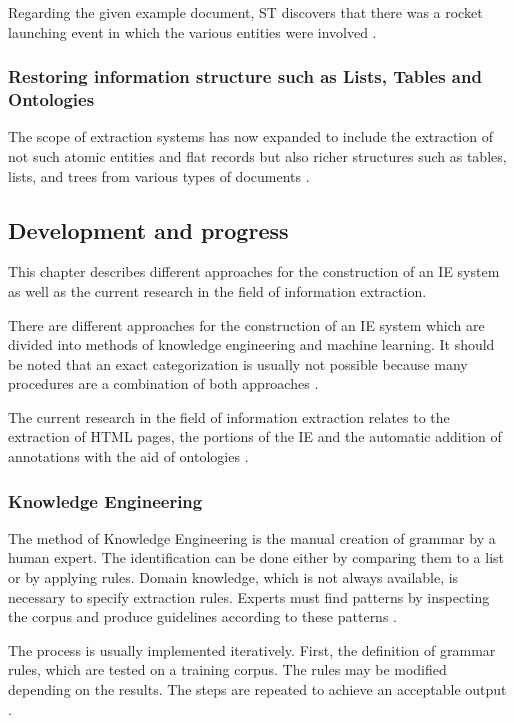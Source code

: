Regarding the given example document, \gls{ST} discovers that there was a rocket launching event in which the various entities were involved \cite{Cunningham:2005}.

\subsubsection{Restoring information structure such as Lists, Tables and Ontologies}
The scope of extraction systems has now expanded to include the extraction of not such atomic entities and flat records but also richer structures such as tables, lists, and trees from various types of documents \cite{Sarawagi:2008}.

\newpage
\subsection{Development and progress}
This chapter describes different approaches for the construction of an IE system as well as the current research in the field of information extraction.

There are different approaches for the construction of an IE system which are divided into methods of knowledge engineering and machine learning. It should be noted that an exact categorization is usually not possible because many procedures are a combination of both approaches \cite{Schramm:2008}.

The current research in the field of information extraction relates to the extraction of HTML pages, the portions of the IE and the automatic addition of annotations with the aid of ontologies \cite{Linsmayr:2010}.

\subsubsection{Knowledge Engineering}
The method of Knowledge Engineering is the manual creation of grammar by a human expert. The identification can be done either by comparing them to a list or by applying rules. Domain knowledge, which is not always available, is necessary to specify extraction rules. Experts must find patterns by inspecting the corpus and produce guidelines according to these patterns \cite{Schramm:2008}\cite{Turmo:2006}.

The process is usually implemented iteratively. First, the definition of grammar rules, which are tested on a training corpus. The rules may be modified depending on the results. The steps are repeated to achieve an acceptable output \cite{Appelt:1999}.


